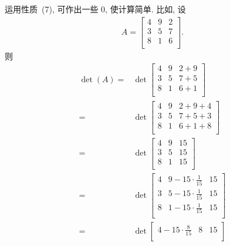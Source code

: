 \documentclass[../libro.tex]{subfiles}
\begin{document}
\begin{example}
    运用性质~(7), 可作出一些 \(0\), 使计算简单.
    比如,
    设
    \begin{align*}
        A =
        \begin{bmatrix}
            4 & 9 & 2 \\
            3 & 5 & 7 \\
            8 & 1 & 6 \\
        \end{bmatrix}.
    \end{align*}
    则
    \begin{align*}
        \det {(A)}
        = {} &
        \det {
            \begin{bmatrix}
                4 & 9 & 2 + 9 \\
                3 & 5 & 7 + 5 \\
                8 & 1 & 6 + 1 \\
            \end{bmatrix}
        }
        \\
        = {} &
        \det {
            \begin{bmatrix}
                4 & 9 & 2 + 9 + 4 \\
                3 & 5 & 7 + 5 + 3 \\
                8 & 1 & 6 + 1 + 8 \\
            \end{bmatrix}
        }
        \\
        = {} &
        \det {
            \begin{bmatrix}
                4 & 9 & 15 \\
                3 & 5 & 15 \\
                8 & 1 & 15 \\
            \end{bmatrix}
        }
        \\
        = {} &
        \det {
            \begin{bmatrix}
                4 & 9 - 15 \cdot \frac{1}{15} & 15 \\
                3 & 5 - 15 \cdot \frac{1}{15} & 15 \\
                8 & 1 - 15 \cdot \frac{1}{15} & 15 \\
            \end{bmatrix}
        }
        \\
        = {} &
        \det {
            \begin{bmatrix}
                4 - 15 \cdot \frac{8}{15} & 8 & 15 \\

\end{bmatrix}}
\end{align*}
\end{example}
\end{document}

